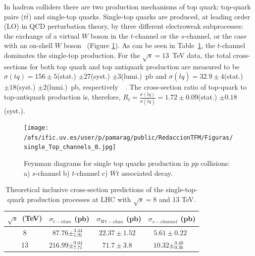In hadron colliders there are two production mechanisms of top quark: top-quark pairs ($t\bar{t}$) and single-top quarks. Single-top quarks are produced, at leading order (LO) in QCD perturbation theory, by three different electroweak subprocesses: the exchange of a virtual $W$ boson in the \mbox{$t$-channel} or the \mbox{$s$-channel}, or the case with an on-shell $W$ boson~\cite{Probing} (Figure \ref{Fig:FeynmanSingTopProd}). %
As can be seen in Table~\ref{Tab:xSections}, the $t$-channel dominates the single-top production.%
 For the $\sqrt{s}=13$~TeV data, the total cross-sections for both top quark and top antiquark production are measured to be $\sigma(tq)=156 \pm 5$(stat.) $\pm 27$(syst.) $\pm 3$(lumi.)~pb and $\sigma(\bar{t}q)=32.9\pm 4$(stat.) $\pm 18$(syst.) $\pm 2$(lumi.)~pb, respectively~\cite{Hirschbuehl:2017veq}~\cite{Aaboud:2016ymp}. The cross-section ratio of top-quark to top-antiquark production is, therefore, $R_t = \frac{\sigma(tq)}{\sigma(\bar{t}q)}= 1.72 \pm 0.09$(stat.) $\pm 0.18$(syst.).
 
\begin{figure}[h]
\centering
\texttt{[image: /afs/ific.uv.es/user/p/pamarag/public/RedaccionTFM/Figuras/single\_Top\_channels\_0.jpg]}
\caption{Feynman diagrams for single top quarks production in $pp$ collisions: a) $s$-channel b) $t$-channel c) $Wt$ associated decay.}
\label{Fig:FeynmanSingTopProd}
\end{figure}


\begin{table}
\centering
\begin{tabular}{|c | c c c|} 
 \hline
 $\sqrt{s}$~(TeV)& $\sigma_{t-chan}$ (pb)& $\sigma_{Wt-chan}$ (pb) & $\sigma_{s-channel}$ (pb) \\
 \hline
 8 & $87.76\pm^{3.44}_{1.91}$~\cite{Kidonakis:2011wy} & $22.37\pm 1.52$~\cite{Kidonakis:2010ux} & $5.61\pm0.22$~\cite{Kidonakis:2010tc} \\
 13 & $216.99\pm^{9.04}_{7.71}$~\cite{Kant:2014oha}~\cite{Aliev:2010zk}& $71.7\pm 3.8$~\cite{Kidonakis:2010ux} & $10.32\pm^{0.40}_{0.36}$~\cite{Kant:2014oha}~\cite{Aliev:2010zk}\\
 \hline
\end{tabular}
\caption{Theoretical inclusive cross-section predictions of the single-top-quark production processes at LHC with $\sqrt{s} = 8$ and 13 TeV.}
\label{Tab:xSections}
\end{table}

